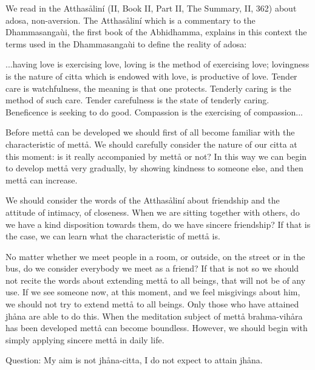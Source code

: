 \documentclass[12pt,twoside]{article}
\begin{document}
We read in the Atthas{\aa}lin\'i (II, Book II, Part II, The Summary, II,
362) about adosa, non{}-aversion. The Atthas{\aa}lin\'i which is a
commentary to the Dhammasanga\`ui, the first book of the Abhidhamma,
explains in this context the terms used in the Dhammasanga\`ui to
define the reality of adosa:


\bigskip

{\textasciigrave}{\textasciigrave}...having
love{\textquotesingle}{\textquotesingle} is exercising love,
{\textasciigrave}{\textasciigrave}loving{\textquotesingle}{\textquotesingle}
is the method of exercising love; lovingness is the nature of citta
which is endowed with love, is productive of love. Tender care is
watchfulness, the meaning is that one protects. Tenderly caring is the
method of such care. Tender carefulness is the state of tenderly
caring. Beneficence is seeking to do good.
{\textasciigrave}{\textasciigrave}Compassion{\textquotesingle}{\textquotesingle}
is the exercising of compassion...


\bigskip

Before mett{\aa} can be developed we should first of all become familiar
with the characteristic of mett{\aa}. We should carefully consider the
nature of our citta at this moment: is it really accompanied by
mett{\aa} or not? In this way we can begin to develop mett{\aa} very
gradually, by showing kindness to someone else, and then mett{\aa} can
increase. 

We should consider the words of the
{\textasciigrave}{\textasciigrave}Atthas{\aa}lin\'i{\textquotesingle}{\textquotesingle}
about friendship and the attitude of intimacy, of closeness. When we
are sitting together with others, do we have a kind disposition towards
them, do we have sincere friendship? If that is the case, we can learn
what the characteristic of mett{\aa} is. 

No matter whether we meet people in a room, or outside, on the street or
in the bus, do we consider everybody we meet as a friend? If that is
not so we should not recite the words about extending mett{\aa} to all
beings, that will not be of any use. If we see someone now, at this
moment, and we feel misgivings about him, we should not try to extend
mett{\aa} to all beings. Only those who have attained jh{\aa}na are
able to do this. When the meditation subject of mett{\aa}
brahma{}-vih{\aa}ra has been developed mett{\aa} can become boundless.
However, we should begin with simply applying sincere mett{\aa} in
daily life. 

Question: My aim is not jh{\aa}na{}-citta, I do not expect to attain
jh{\aa}na. 
\end{document}
